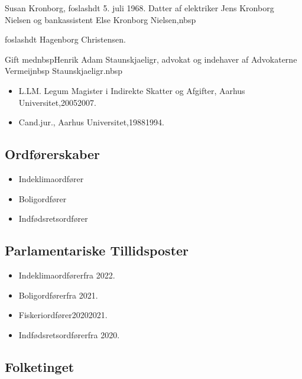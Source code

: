 \documentclass[11pt, a4paper]{awesome-cv}
\begin{document}
\makecvheader[R]
\makelettertitle
\begin{cvletter}
Susan Kronborg, foslashdt 5. juli 1968. Datter af elektriker Jens Kronborg Nielsen og bankassistent Else Kronborg Nielsen,nbsp

foslashdt Hagenborg Christensen.

 Gift mednbspHenrik Adam Staunskjaeligr, advokat og indehaver af Advokaterne Vermeijnbsp Staunskjaeligr.nbsp

\begin{itemize}
\item L.LM. Legum Magister i Indirekte Skatter og Afgifter, Aarhus Universitet,20052007.
\item Cand.jur., Aarhus Universitet,19881994.
\end{itemize}
\subsection*{Ordførerskaber}
\begin{itemize}
\item Indeklimaordfører
\item Boligordfører
\item Indfødsretsordfører
\end{itemize}
\subsection*{Parlamentariske Tillidsposter}
\begin{itemize}
\item Indeklimaordførerfra 2022.
\item Boligordførerfra 2021.
\item Fiskeriordfører20202021.
\item Indfødsretsordførerfra 2020.
\end{itemize}
\subsection*{Folketinget}

\end{cvletter}
\end{document}
